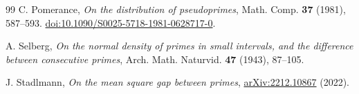 \documentclass[11pt]{amsart}
\begin{document}
\begin{thebibliography}{99}
 C. Pomerance,
\emph{On the distribution of pseudoprimes},
Math. Comp. \textbf{37} (1981), 587--593.
\href{https://doi.org/10.1090/S0025-5718-1981-0628717-0}{doi:10.1090/S0025-5718-1981-0628717-0}.

 A. Selberg,
\emph{On the normal density of primes in small intervals, and the difference
between consecutive primes}, Arch. Math. Naturvid. \textbf{47} (1943), 87--105.

 J. Stadlmann,
\emph{On the mean square gap between primes},
\href{https://arxiv.org/abs/2212.10867}{arXiv:2212.10867} (2022).

\end{thebibliography}
\end{document}
